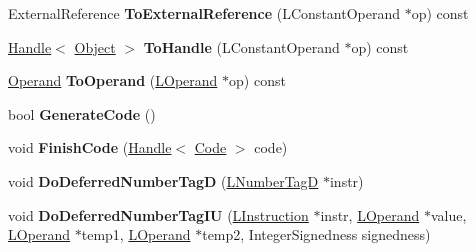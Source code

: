\begin{DoxyCompactItemize}
\item 
External\+Reference {\bfseries To\+External\+Reference} (L\+Constant\+Operand $\ast$op) const \hypertarget{classv8_1_1internal_1_1_l_code_gen_a3ca26cfdcbaa03743c656cb06da95f4c}{}\label{classv8_1_1internal_1_1_l_code_gen_a3ca26cfdcbaa03743c656cb06da95f4c}

\item 
\hyperlink{classv8_1_1internal_1_1_handle}{Handle}$<$ \hyperlink{classv8_1_1internal_1_1_object}{Object} $>$ {\bfseries To\+Handle} (L\+Constant\+Operand $\ast$op) const \hypertarget{classv8_1_1internal_1_1_l_code_gen_ab75f8785eb99d07a1585c9402a3b4d5e}{}\label{classv8_1_1internal_1_1_l_code_gen_ab75f8785eb99d07a1585c9402a3b4d5e}

\item 
\hyperlink{classv8_1_1internal_1_1_operand}{Operand} {\bfseries To\+Operand} (\hyperlink{classv8_1_1internal_1_1_l_operand}{L\+Operand} $\ast$op) const \hypertarget{classv8_1_1internal_1_1_l_code_gen_a4cf154a6406dded9b5b784b568192163}{}\label{classv8_1_1internal_1_1_l_code_gen_a4cf154a6406dded9b5b784b568192163}

\item 
bool {\bfseries Generate\+Code} ()\hypertarget{classv8_1_1internal_1_1_l_code_gen_aa1307599a440d099f0dbb5dc24f4f59c}{}\label{classv8_1_1internal_1_1_l_code_gen_aa1307599a440d099f0dbb5dc24f4f59c}

\item 
void {\bfseries Finish\+Code} (\hyperlink{classv8_1_1internal_1_1_handle}{Handle}$<$ \hyperlink{classv8_1_1internal_1_1_code}{Code} $>$ code)\hypertarget{classv8_1_1internal_1_1_l_code_gen_a5278837d092b8413daa548719c34864c}{}\label{classv8_1_1internal_1_1_l_code_gen_a5278837d092b8413daa548719c34864c}

\item 
void {\bfseries Do\+Deferred\+Number\+TagD} (\hyperlink{classv8_1_1internal_1_1_l_number_tag_d}{L\+Number\+TagD} $\ast$instr)\hypertarget{classv8_1_1internal_1_1_l_code_gen_af3b589c0911c5e01a018ecee64b7e926}{}\label{classv8_1_1internal_1_1_l_code_gen_af3b589c0911c5e01a018ecee64b7e926}

\item 
void {\bfseries Do\+Deferred\+Number\+Tag\+IU} (\hyperlink{classv8_1_1internal_1_1_l_instruction}{L\+Instruction} $\ast$instr, \hyperlink{classv8_1_1internal_1_1_l_operand}{L\+Operand} $\ast$value, \hyperlink{classv8_1_1internal_1_1_l_operand}{L\+Operand} $\ast$temp1, \hyperlink{classv8_1_1internal_1_1_l_operand}{L\+Operand} $\ast$temp2, Integer\+Signedness signedness)\hypertarget{classv8_1_1internal_1_1_l_code_gen_a81fedc95085cf988c8e3d548e1c9a5f1}{}\label{classv8_1_1internal_1_1_l_code_gen_a81fedc95085cf988c8e3d548e1c9a5f1}


\end{DoxyCompactItemize}
